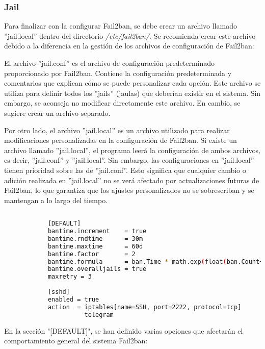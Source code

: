 			\subsubsection{Jail}
			
			
			Para finalizar con la configurar Fail2ban, se debe crear un archivo llamado ''jail.local'' dentro del directorio \textit{/etc/fail2ban/}. Se recomienda crear este archivo debido a la diferencia en la gestión de los archivos de configuración de Fail2ban:\par
			
			El archivo ''jail.conf'' es el archivo de configuración predeterminado proporcionado por Fail2ban. Contiene la configuración predeterminada y comentarios que explican cómo se puede personalizar cada opción. Este archivo se utiliza para definir todos los ''jails'' (jaulas) que deberían existir en el sistema. Sin embargo, se aconseja no modificar directamente este archivo. En cambio, se sugiere crear un archivo separado.\par
			
			Por otro lado, el archivo ''jail.local'' es un archivo utilizado para realizar modificaciones personalizadas en la configuración de Fail2ban. Si existe un archivo llamado ''jail.local'', el programa leerá la configuración de ambos archivos, es decir, ''jail.conf'' y ''jail.local''. Sin embargo, las configuraciones en ''jail.local'' tienen prioridad sobre las de ''jail.conf''. Esto significa que cualquier cambio o adición realizada en ''jail.local'' no se verá afectado por actualizaciones futuras de Fail2ban, lo que garantiza que los ajustes personalizados no se sobrescriban y se mantengan a lo largo del tiempo.\par
		
			\begin{lstlisting}[language=Bash, caption=Jaula ssh]
		
			[DEFAULT]
			bantime.increment    = true
			bantime.rndtime      = 30m
			bantime.maxtime      = 60d
			bantime.factor       = 2
			bantime.formula      = ban.Time * math.exp(float(ban.Count+1)*banFactor)/math.exp(1*banFactor)
			bantime.overalljails = true
			maxretry = 3
			
			[sshd]
			enabled = true
			action  = iptables[name=SSH, port=2222, protocol=tcp]
					  telegram
			\end{lstlisting}
		
		
				En la sección "[DEFAULT]", se han definido varias opciones que afectarán el comportamiento general del sistema Fail2ban:\par
			
